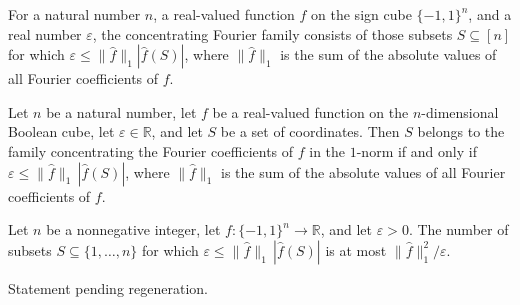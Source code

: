 \begin{definition}
\label{FABL.l1ConcentratingFourierFamily}
\leanok
{}
For a natural number $n$, a real-valued function $f$ on the sign cube $\{−1,1\}^n$,
and a real number $\varepsilon$, the concentrating Fourier family consists of those
subsets $S\subseteq[n]$ for which $\varepsilon\leq \|\widehat f\|_1 |\widehat
f(S)|$, where $\|\widehat f\|_1$ is the sum of the absolute values of all Fourier
coefficients of $f$.
\end{definition}

\begin{theorem}
\label{FABL.mem_l1ConcentratingFourierFamily}
\leanok
{}
Let $n$ be a natural number, let $f$ be a real-valued function on the $n$-dimensional
Boolean cube, let $\varepsilon\in\mathbb{R}$, and let $S$ be a set of coordinates.
Then $S$ belongs to the family concentrating the Fourier coefficients of $f$ in the
$1$-norm if and only if $\varepsilon\le \|\widehat f\|_1\,|\widehat f(S)|$, where
$\|\widehat f\|_1$ is the sum of the absolute values of all Fourier coefficients of
$f$.
\end{theorem}

\begin{theorem}
\label{FABL.card_l1ConcentratingFourierFamily_le}
\leanok
{}
Let $n$ be a nonnegative integer, let $f:\{-1,1\}^n\to\mathbb R$, and let
$\varepsilon>0$. The number of subsets $S\subseteq\{1,\ldots,n\}$ for which
$\varepsilon\leq \|\widehat f\|_1\,|\widehat f(S)|$ is at most $\|\widehat
f\|_1^2/\varepsilon$.
\end{theorem}

\begin{theorem}
\label{FABL.isFourierSpectrumConcentratedOn_l1ConcentratingFourierFamily}
\leanok
{}
Statement pending regeneration.
\end{theorem}

